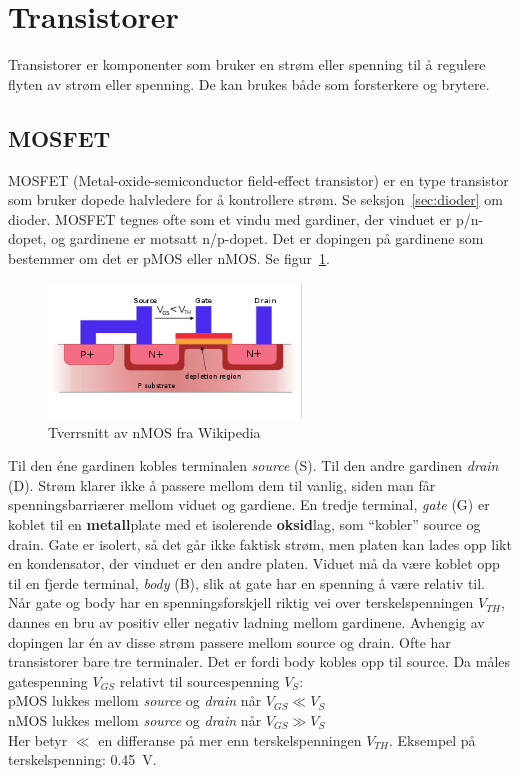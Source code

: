 \documentclass[12pt,a4paper,norsk]{article}
\begin{document}
\section{Transistorer}
Transistorer er komponenter som bruker en strøm eller spenning til å regulere
flyten av strøm eller spenning. De kan brukes både som forsterkere og brytere.

\subsection{MOSFET}
MOSFET (Metal-oxide-semiconductor field-effect transistor) er en type
transistor som bruker dopede halvledere for å kontrollere strøm. Se
seksjon~\ref{sec:dioder} om dioder. MOSFET tegnes ofte som et vindu med
gardiner, der vinduet er p/n-dopet, og gardinene er motsatt n/p-dopet. Det er
dopingen på gardinene som bestemmer om det er pMOS eller nMOS. Se figur~\ref{fig:nMOS}.

\begin{figure}[hbt!]
  \centering
  \includegraphics[width=0.6\textwidth,height=\textheight,keepaspectratio]{Krets_nMOS}
  \caption{Tverrsnitt av nMOS fra Wikipedia\label{fig:nMOS}}
\end{figure}

Til den éne gardinen kobles terminalen \textit{source} (S). Til den andre
gardinen \textit{drain} (D). Strøm klarer ikke å passere mellom dem til vanlig,
siden man får spenningsbarriærer mellom viduet og gardiene. En tredje terminal,
\textit{gate} (G) er koblet til en \textbf{metall}plate med et isolerende
\textbf{oksid}lag, som ``kobler'' source og drain. Gate er isolert, så det går
ikke faktisk strøm, men platen kan lades opp likt en kondensator, der vinduet er
den andre platen. Viduet må da være koblet opp til en fjerde terminal,
\textit{body} (B), slik at gate har en spenning å være relativ til. Når gate og
body har en spenningsforskjell riktig vei over terskelspenningen $V_{TH}$,
dannes en bru av positiv eller negativ ladning mellom gardinene. Avhengig av
dopingen lar én av disse strøm passere mellom source og drain.
%
Ofte har transistorer bare tre terminaler. Det er fordi body kobles opp til
source. Da måles gatespenning $V_{GS}$ relativt til sourcespenning $V_{S}$: \\
%
pMOS lukkes mellom \textit{source} og \textit{drain} når $V_{GS} \ll V_{S}$\\
nMOS lukkes mellom \textit{source} og \textit{drain} når $V_{GS} \gg V_{S}$\\
Her betyr $\ll$ en differanse på mer enn terskelspenningen $V_{TH}$. Eksempel på
terskelspenning: \SI{0.45}{\volt}.
\end{document}
